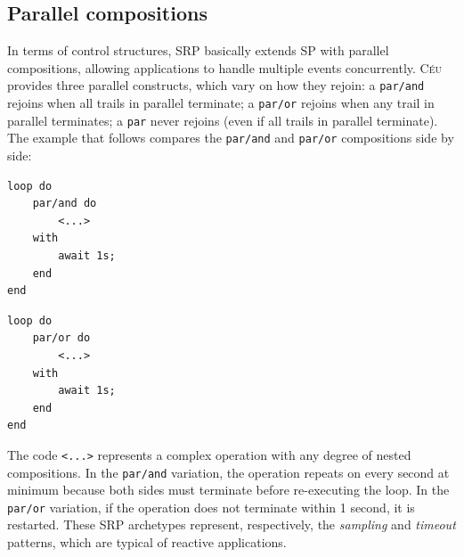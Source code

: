 \documentclass{acm_proc_article-sp}
\newcommand{\CEU}{\textsc{C\'{e}u}\xspace}
\newcommand{\code}[1] {{\small{\texttt{#1}}}}
\newcommand{\1}{\;}
\newcommand{\2}{\;\;}
\newcommand{\3}{\;\;\;}
\newcommand{\5}{\;\;\;\;\;}
\begin{document}
%



\subsection{Parallel compositions}
\label{sec.ceu.par}

In terms of control structures, SRP basically extends SP with parallel 
compositions, allowing applications to handle multiple events concurrently.
%
\CEU provides three parallel constructs, which vary on how they rejoin:
a \code{par/and} rejoins when all trails in parallel terminate;
a \code{par/or} rejoins when any trail in parallel terminates;
a \code{par} never rejoins (even if all trails in parallel terminate).
%
The example that follows compares the \code{par/and} and \code{par/or} 
compositions side by side:

\begin{minipage}[t]{0.40\linewidth}
\begin{lstlisting}
loop do
    par/and do
        <...>
    with
        await 1s;
    end
end
\end{lstlisting}
\end{minipage}
%
\begin{minipage}[t]{0.40\linewidth}
\begin{lstlisting}
loop do
    par/or do
        <...>
    with
        await 1s;
    end
end
\end{lstlisting}
\end{minipage}

The code \code{<...>} represents a complex operation with any degree of nested 
compositions.
%
In the \code{par/and} variation, the operation repeats on every second at 
minimum because both sides must terminate before re-executing the loop.
In the \code{par/or} variation, if the operation does not terminate within 1 
second, it is restarted.
%
These SRP archetypes represent, respectively, the \emph{sampling} and 
\emph{timeout} patterns, which are typical of reactive applications.
\end{document}
